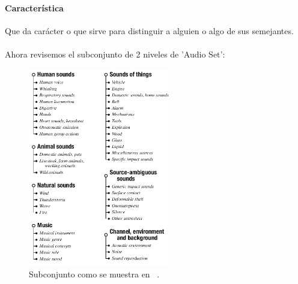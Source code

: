 \documentclass[12pt]{article}
\begin{document}
	\paragraph{Característica} Que da carácter o que sirve para distinguir a alguien o algo de sus semejantes.
	\paragraph{}
	Ahora revisemos el subconjunto de 2 niveles de 'Audio Set':
	\\
	\begin{figure}[h]
		\centering
		\includegraphics[width=0.55\textwidth]{audioSetOntology}
		\caption{Subconjunto como se muestra en ~\cite{gemmeke_audio_2017}.}
		\label{fig:audioOriginal Subset} 
	\end{figure}
\end{document}
